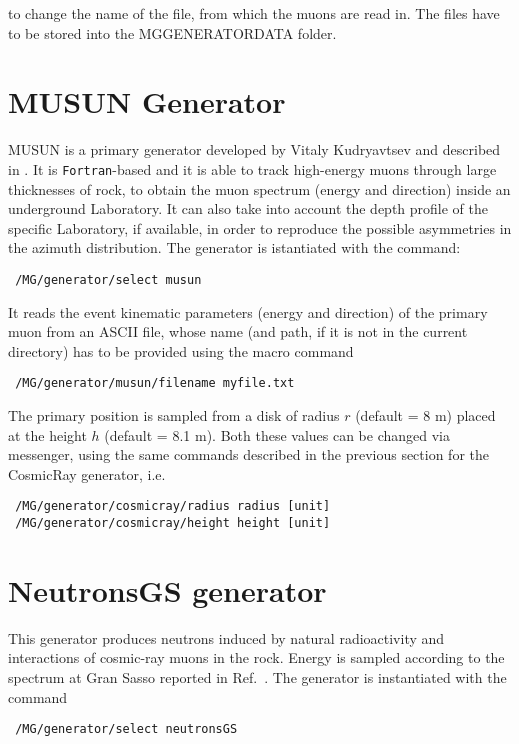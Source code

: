 to change the name of the file, from which the muons are read in. The files have to be stored 
into the MGGENERATORDATA folder. 




\section{MUSUN Generator}
\textsc{MUSUN} is a primary generator developed by Vitaly Kudryavtsev and described 
in \cite{Kudryavtsev:1997}. It is \texttt{Fortran}-based and it is able to track 
high-energy muons through large thicknesses of rock, to obtain the muon spectrum (energy and 
direction) inside an underground Laboratory. It can also take into account 
the depth profile of the specific Laboratory, if available, in order to 
reproduce the possible asymmetries in the azimuth distribution. The \mage  
generator is istantiated with the command:
\begin{lstlisting}
 /MG/generator/select musun
\end{lstlisting}
%
It reads the event kinematic parameters (energy and direction) of 
the primary muon from an ASCII file, whose name (and path, if it is not 
in the current directory) has to be provided using the macro command 
%
\begin{lstlisting}
 /MG/generator/musun/filename myfile.txt
\end{lstlisting}
%
The primary position is sampled from a disk of radius $r$ (default = 8 m) placed 
at the height $h$ (default = 8.1 m). Both these values can be changed via messenger, 
using the same commands described in the previous section for the CosmicRay 
generator, i.e. 
%
\begin{lstlisting}
 /MG/generator/cosmicray/radius radius [unit]
 /MG/generator/cosmicray/height height [unit]
\end{lstlisting}
  
\section{NeutronsGS generator}
This generator produces neutrons induced by natural radioactivity and interactions of cosmic-ray 
muons in the rock. Energy is sampled according to the spectrum at Gran Sasso reported 
in Ref.~\cite{Wulandari:2004}. The generator is instantiated with the command 
 
\begin{lstlisting}
 /MG/generator/select neutronsGS
\end{lstlisting}

